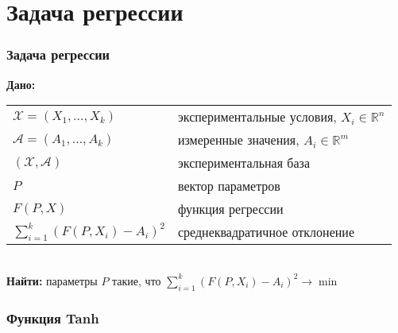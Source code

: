 \documentclass[24pt,pdf,hyperref={unicode}]{beamer}
\begin{document}
\section{Задача регрессии}

\begin{frame}\frametitle{Задача регрессии}
{\bf Дано:}
\begin{tabular}{p{4cm} p{6cm}}
 $\mathcal{X}=(X_1,\ldots,X_k)$ & экспериментальные условия, $X_i\in\mathbb{R}^n$\\[0.1cm]
 $\mathcal{A}=(A_1,\ldots,A_k)$ & измеренные значения, $A_i\in\mathbb{R}^m$\\[0.1cm]
 $(\mathcal{X},\mathcal{A})$ & экспериментальная база \\[0.1cm]
 $P$ & вектор параметров \\[0.1cm]
 $F(P,X)$ & функция регрессии \\[0.1cm]
 $\sum_{i=1}^{k} (F(P,X_i)-A_i)^2 $ & среднеквадратичное отклонение\\
 \end{tabular}\\[1cm]
 {\bf Найти:}
 параметры $P$ такие, что $\sum_{i=1}^{k} (F(P,X_i)-A_i)^2 \rightarrow \min$
\end{frame}

\begin{frame}\frametitle{Функция Tanh}
\end{frame}
\end{document}
